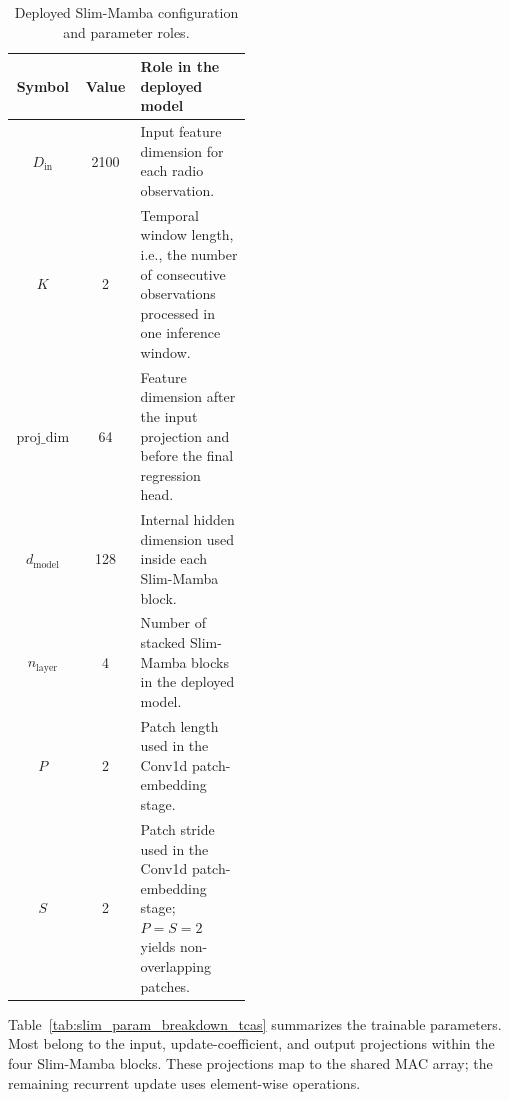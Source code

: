 \documentclass[lettersize,journal]{IEEEtran}
\begin{document}
\begin{table}[!t]
\caption{Deployed Slim-Mamba configuration and parameter roles.}
\label{tab:slim_config_tcas}
\begin{center}
\footnotesize
\setlength{\tabcolsep}{4pt}
\renewcommand{\arraystretch}{1.08}
\begin{tabular}{|c|c|p{0.47\linewidth}|}
\hline
\textbf{Symbol} & \textbf{Value} & \textbf{Role in the deployed model} \\
\hline
\(D_{\mathrm{in}}\) & 2100 & Input feature dimension for each radio observation. \\
\hline
\(K\) & 2 & Temporal window length, i.e., the number of consecutive observations processed in one inference window. \\
\hline
\(\text{proj\_dim}\) & 64 & Feature dimension after the input projection and before the final regression head. \\
\hline
\(d_{\mathrm{model}}\) & 128 & Internal hidden dimension used inside each Slim-Mamba block. \\
\hline
\(n_{\mathrm{layer}}\) & 4 & Number of stacked Slim-Mamba blocks in the deployed model. \\
\hline
\(P\) & 2 & Patch length used in the Conv1d patch-embedding stage. \\
\hline
\(S\) & 2 & Patch stride used in the Conv1d patch-embedding stage; \(P=S=2\) yields non-overlapping patches. \\
\hline
\end{tabular}
\end{center}
\end{table}

Table~\ref{tab:slim_param_breakdown_tcas} summarizes the trainable parameters.
Most belong to the input, update-coefficient, and output projections within
the four Slim-Mamba blocks. These projections map to the shared MAC array;
the remaining recurrent update uses element-wise operations.
\end{document}
